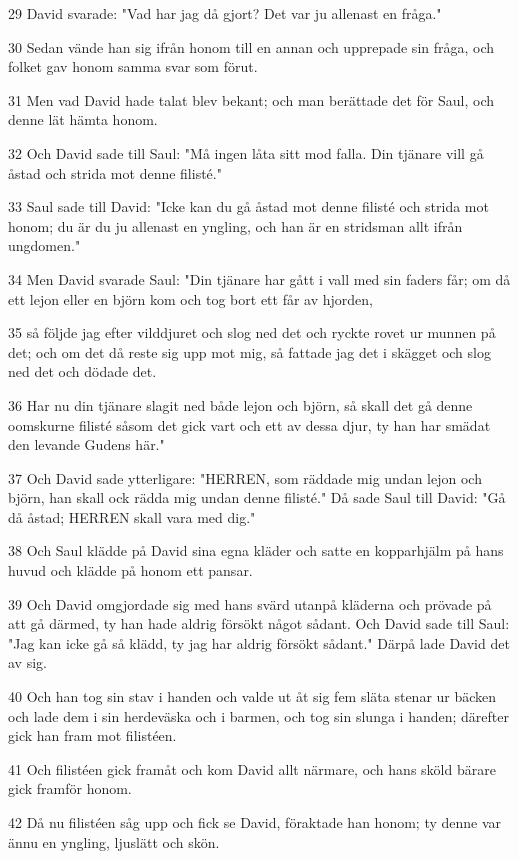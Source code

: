 \par 29 David svarade: "Vad har jag då gjort? Det var ju allenast en fråga."
\par 30 Sedan vände han sig ifrån honom till en annan och upprepade sin fråga, och folket gav honom samma svar som förut.
\par 31 Men vad David hade talat blev bekant; och man berättade det för Saul, och denne lät hämta honom.
\par 32 Och David sade till Saul: "Må ingen låta sitt mod falla. Din tjänare vill gå åstad och strida mot denne filisté."
\par 33 Saul sade till David: "Icke kan du gå åstad mot denne filisté och strida mot honom; du är du ju allenast en yngling, och han är en stridsman allt ifrån ungdomen."
\par 34 Men David svarade Saul: "Din tjänare har gått i vall med sin faders får; om då ett lejon eller en björn kom och tog bort ett får av hjorden,
\par 35 så följde jag efter vilddjuret och slog ned det och ryckte rovet ur munnen på det; och om det då reste sig upp mot mig, så fattade jag det i skägget och slog ned det och dödade det.
\par 36 Har nu din tjänare slagit ned både lejon och björn, så skall det gå denne oomskurne filisté såsom det gick vart och ett av dessa djur, ty han har smädat den levande Gudens här."
\par 37 Och David sade ytterligare: "HERREN, som räddade mig undan lejon och björn, han skall ock rädda mig undan denne filisté." Då sade Saul till David: "Gå då åstad; HERREN skall vara med dig."
\par 38 Och Saul klädde på David sina egna kläder och satte en kopparhjälm på hans huvud och klädde på honom ett pansar.
\par 39 Och David omgjordade sig med hans svärd utanpå kläderna och prövade på att gå därmed, ty han hade aldrig försökt något sådant. Och David sade till Saul: "Jag kan icke gå så klädd, ty jag har aldrig försökt sådant." Därpå lade David det av sig.
\par 40 Och han tog sin stav i handen och valde ut åt sig fem släta stenar ur bäcken och lade dem i sin herdeväska och i barmen, och tog sin slunga i handen; därefter gick han fram mot filistéen.
\par 41 Och filistéen gick framåt och kom David allt närmare, och hans sköld bärare gick framför honom.
\par 42 Då nu filistéen såg upp och fick se David, föraktade han honom; ty denne var ännu en yngling, ljuslätt och skön.
